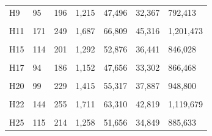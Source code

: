 \documentclass[
  a4paper,
  titlepage]{article}
\begin{document}
\begin{longtable}[t]{lllllll}
H9 & 95 & 196 & 1,215 & 47,496 & 32,367 & 792,413\\
 
\cellcolor{gray!6}{H10} & \cellcolor{gray!6}{159} & \cellcolor{gray!6}{258} & \cellcolor{gray!6}{1,837} & \cellcolor{gray!6}{70,389} & \cellcolor{gray!6}{47,648} & \cellcolor{gray!6}{1,251,032}\\
 
H11 & 171 & 249 & 1,687 & 66,809 & 45,316 & 1,201,473\\
 
\cellcolor{gray!6}{H13} & \cellcolor{gray!6}{103} & \cellcolor{gray!6}{218} & \cellcolor{gray!6}{1,349} & \cellcolor{gray!6}{53,207} & \cellcolor{gray!6}{35,936} & \cellcolor{gray!6}{1,062,125}\\
 
H15 & 114 & 201 & 1,292 & 52,876 & 36,441 & 846,028\\
 
\cellcolor{gray!6}{H16} & \cellcolor{gray!6}{104} & \cellcolor{gray!6}{212} & \cellcolor{gray!6}{1,387} & \cellcolor{gray!6}{55,508} & \cellcolor{gray!6}{38,022} & \cellcolor{gray!6}{1,016,643}\\
 
H17 & 94 & 186 & 1,152 & 47,656 & 33,302 & 866,468\\
 
\cellcolor{gray!6}{H18} & \cellcolor{gray!6}{120} & \cellcolor{gray!6}{211} & \cellcolor{gray!6}{1,461} & \cellcolor{gray!6}{56,326} & \cellcolor{gray!6}{38,092} & \cellcolor{gray!6}{1,064,229}\\
 
H20 & 99 & 229 & 1,415 & 55,317 & 37,887 & 948,800\\
 
\cellcolor{gray!6}{H21} & \cellcolor{gray!6}{124} & \cellcolor{gray!6}{231} & \cellcolor{gray!6}{1,572} & \cellcolor{gray!6}{58,614} & \cellcolor{gray!6}{39,408} & \cellcolor{gray!6}{1,019,332}\\
 
H22 & 144 & 255 & 1,711 & 63,310 & 42,819 & 1,119,679\\
 
\cellcolor{gray!6}{H23} & \cellcolor{gray!6}{115} & \cellcolor{gray!6}{221} & \cellcolor{gray!6}{1,394} & \cellcolor{gray!6}{52,129} & \cellcolor{gray!6}{34,927} & \cellcolor{gray!6}{892,793}\\
 
H25 & 115 & 214 & 1,258 & 51,656 & 34,849 & 885,633\\
 

\end{longtable}
\end{document}

